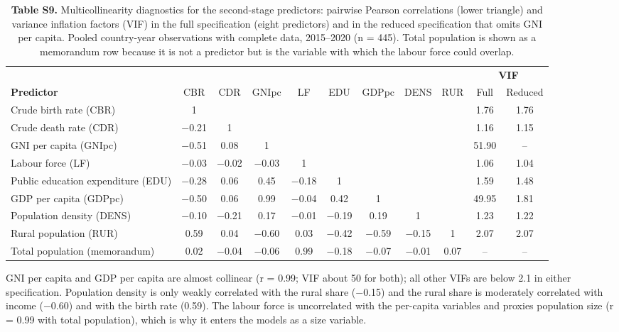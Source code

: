 \documentclass[11pt,letterpaper]{article}
\begin{document}
\clearpage
\begin{table}[htbp]
\footnotesize
\setlength{\tabcolsep}{4pt}
\caption{\textbf{Table S9.} Multicollinearity diagnostics for the second-stage predictors: pairwise Pearson correlations (lower triangle) and variance inflation factors (VIF) in the full specification (eight predictors) and in the reduced specification that omits GNI per capita. Pooled country-year observations with complete data, 2015--2020 (n = 445). Total population is shown as a memorandum row because it is not a predictor but is the variable with which the labour force could overlap.}
\begin{tabular}{@{}lcccccccc cc@{}}
\toprule
& & & & & & & & & \multicolumn{2}{c}{\textbf{VIF}} \\
\cmidrule(lr){10-11}
\textbf{Predictor} & CBR & CDR & GNIpc & LF & EDU & GDPpc & DENS & RUR & Full & Reduced \\
\midrule
Crude birth rate (CBR) & 1 & & & & & & & & 1.76 & 1.76 \\
Crude death rate (CDR) & $-$0.21 & 1 & & & & & & & 1.16 & 1.15 \\
GNI per capita (GNIpc) & $-$0.51 & 0.08 & 1 & & & & & & 51.90 & -- \\
Labour force (LF) & $-$0.03 & $-$0.02 & $-$0.03 & 1 & & & & & 1.06 & 1.04 \\
Public education expenditure (EDU) & $-$0.28 & 0.06 & 0.45 & $-$0.18 & 1 & & & & 1.59 & 1.48 \\
GDP per capita (GDPpc) & $-$0.50 & 0.06 & 0.99 & $-$0.04 & 0.42 & 1 & & & 49.95 & 1.81 \\
Population density (DENS) & $-$0.10 & $-$0.21 & 0.17 & $-$0.01 & $-$0.19 & 0.19 & 1 & & 1.23 & 1.22 \\
Rural population (RUR) & 0.59 & 0.04 & $-$0.60 & 0.03 & $-$0.42 & $-$0.59 & $-$0.15 & 1 & 2.07 & 2.07 \\
\midrule
Total population (memorandum) & 0.02 & $-$0.04 & $-$0.06 & 0.99 & $-$0.18 & $-$0.07 & $-$0.01 & 0.07 & -- & -- \\
\bottomrule
\end{tabular}

\vspace{4pt}
{\footnotesize GNI per capita and GDP per capita are almost collinear (r = 0.99; VIF about 50 for both); all other VIFs are below 2.1 in either specification. Population density is only weakly correlated with the rural share ($-$0.15) and the rural share is moderately correlated with income ($-$0.60) and with the birth rate (0.59). The labour force is uncorrelated with the per-capita variables and proxies population size (r = 0.99 with total population), which is why it enters the models as a size variable.}
\end{table}
\end{document}
